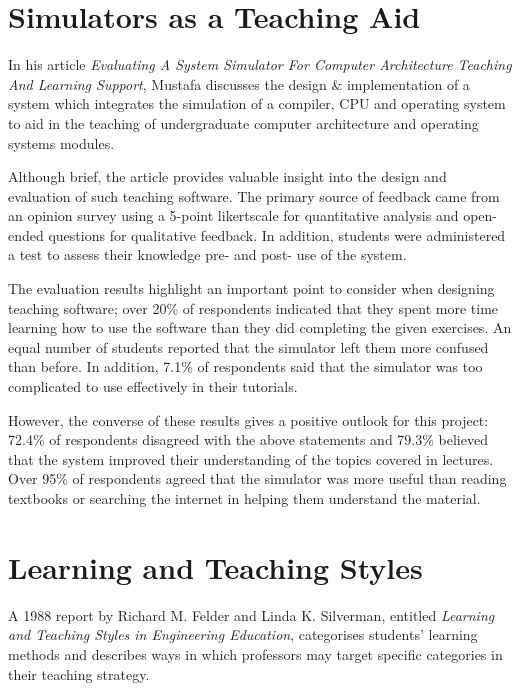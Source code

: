 \documentclass[bsc,twoside,singlespacing,parskip,logo,notimes,normalheadings]{infthesis}
\begin{document}
    \section{Simulators as a Teaching Aid}\label{sec:mustafa-simulator}

    In his article {\em Evaluating A System Simulator For Computer
      Architecture Teaching And Learning Support}\cite{mustafa2010},
    Mustafa discusses the design \& implementation of a system
    which integrates the simulation of a compiler, CPU and operating
    system to aid in the teaching of undergraduate computer
    architecture and operating systems modules.

    Although brief, the article provides valuable insight into the
    design and evaluation of such teaching software. The primary
    source of feedback came from an opinion survey using a 5-point
    \gls{likertscale} for quantitative analysis and open-ended questions
    for qualitative feedback. In addition, students were administered
    a test to assess their knowledge pre- and post- use of the system.

    The evaluation results highlight an important point to consider
    when designing teaching software; over 20\% of respondents
    indicated that they spent more time learning how to use the
    software than they did completing the given exercises. An equal
    number of students reported that the simulator left them more
    confused than before. In addition, 7.1\% of respondents said that
    the simulator was too complicated to use effectively in their
    tutorials.

    However, the converse of these results gives a positive outlook
    for this project: 72.4\% of respondents disagreed with the above
    statements and 79.3\% believed that the system improved their
    understanding of the topics covered in lectures. Over 95\% of
    respondents agreed that the simulator was more useful than reading
    textbooks or searching the internet in helping them understand the
    material.

    \section{Learning and Teaching Styles}

    A 1988 report by Richard M. Felder and Linda K. Silverman,
    entitled {\em Learning and Teaching Styles in Engineering
      Education}\cite{felder1988}, categorises students' learning
    methods and describes ways in which professors may target specific
    categories in their teaching strategy.
\end{document}
